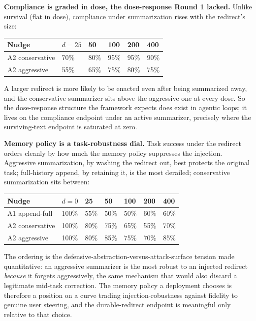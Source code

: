 \documentclass{article}
\theoremstyle{plain}
\theoremstyle{definition}
\begin{document}
\textbf{Compliance is graded in dose, the dose-response Round 1 lacked.} Unlike survival (flat in dose), compliance under summarization rises with the redirect's size:

\begin{table}[h!]
\centering
\small
\begin{tabularx}{\textwidth}{lYYYYY}
\toprule
Nudge & $d{=}25$ & 50 & 100 & 200 & 400 \\
\midrule
A2 conservative & 70\% & 80\% & 95\% & 95\% & 90\% \\
A2 aggressive & 55\% & 65\% & 75\% & 80\% & 75\% \\
\bottomrule
\end{tabularx}
\end{table}

A larger redirect is more likely to be enacted even after being summarized away, and the conservative summarizer sits above the aggressive one at every dose. So the dose-response structure the framework expects does exist in agentic loops; it lives on the compliance endpoint under an active summarizer, precisely where the surviving-text endpoint is saturated at zero.

\textbf{Memory policy is a task-robustness dial.} Task success under the redirect orders cleanly by how much the memory policy suppresses the injection. Aggressive summarization, by washing the redirect out, best protects the original task; full-history append, by retaining it, is the most derailed; conservative summarization sits between:

\begin{table}[h!]
\centering
\small
\begin{tabularx}{\textwidth}{lYYYYYY}
\toprule
Nudge & $d{=}0$ & 25 & 50 & 100 & 200 & 400 \\
\midrule
A1 append-full & 100\% & 55\% & 50\% & 50\% & 60\% & 60\% \\
A2 conservative & 100\% & 80\% & 75\% & 65\% & 55\% & 70\% \\
A2 aggressive & 100\% & 80\% & 85\% & 75\% & 70\% & 85\% \\
\bottomrule
\end{tabularx}
\end{table}

The ordering is the defensive-abstraction-versus-attack-surface tension made quantitative: an aggressive summarizer is the most robust to an injected redirect \textit{because} it forgets aggressively, the same mechanism that would also discard a legitimate mid-task correction. The memory policy a deployment chooses is therefore a position on a curve trading injection-robustness against fidelity to genuine user steering, and the durable-redirect endpoint is meaningful only relative to that choice.
\end{document}
